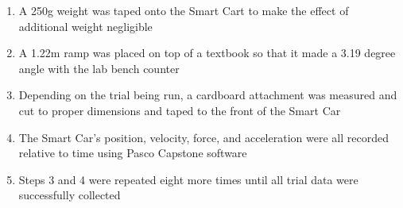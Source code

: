 \begin{enumerate}
    \item A 250g weight was taped onto the Smart Cart to make the effect of additional weight negligible
    \item A 1.22m ramp was placed on top of a textbook so that it made a 3.19 degree angle with the lab bench counter
    \item Depending on the trial being run, a cardboard attachment was measured and cut to proper dimensions and taped to the front of the Smart Car
    \item The Smart Car's position, velocity, force, and acceleration were all recorded relative to time using Pasco Capstone software
    \item Steps 3 and 4 were repeated eight more times until all trial data were successfully collected
\end{enumerate}
